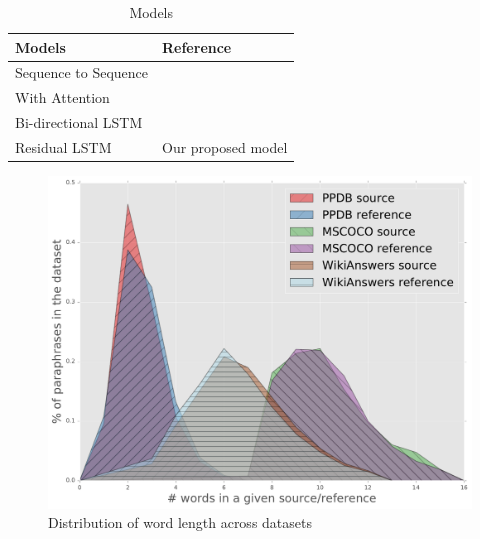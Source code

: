 \begin{table}
      \centering
        \begin{tabular}{ll}
        \midrule
        \textbf{Models}                                      & \textbf{Reference}  \\
        \midrule
        Sequence to Sequence                                 & \cite{SutskeverVL14} \\
        With Attention                                       & \cite{Bahdanau15} \\
        Bi-directional LSTM                                  & \cite{graves2013hybrid} \\
        Residual LSTM                                        & Our proposed model                                   \\             
        \midrule
        \end{tabular}
        \caption{Models}
\end{table}


\begin{figure}
    \centering
    \includegraphics[scale=0.50]{figures/paraphrase/wordlength.pdf}
    \caption[Distribution of word length]{Distribution of word length across datasets}
    \label{fig:res1}
\end{figure}

 
